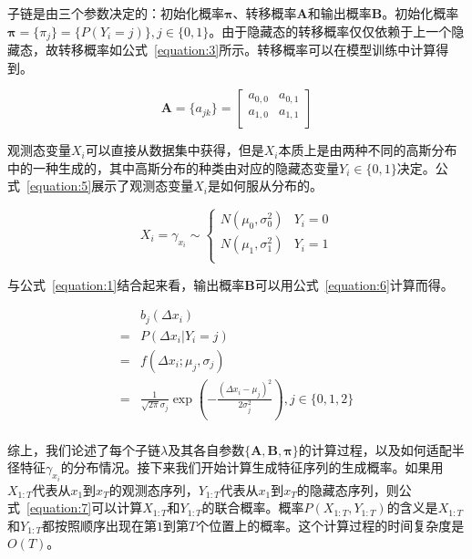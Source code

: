 子链是由三个参数决定的：初始化概率$\mathbf{\pi}$、转移概率$\mathbf{A}$和输出概率$\mathbf{B}$。初始化概率$\mathbf{\pi} = \{\pi_j\} = \{P(Y_i = j)\}, j \in \{0,1\}$。由于隐藏态的转移概率仅仅依赖于上一个隐藏态，故转移概率如公式~\eqref{equation:3}所示。转移概率可以在模型训练中计算得到。

\begin{equation}
\label{equation:3}
\mathbf{A} = \{a_{jk}\} = 
\begin{bmatrix}
a_{0,0}	&	a_{0,1}	\\
a_{1,0}	&	a_{1,1}	\\
\end{bmatrix}
\end{equation}

观测态变量$X_i$可以直接从数据集中获得，但是$X_i$本质上是由两种不同的高斯分布中的一种生成的，其中高斯分布的种类由对应的隐藏态变量$Y_i \in \{0,1\}$决定。公式~\eqref{equation:5}展示了观测态变量$X_i$是如何服从分布的。

\begin{equation}
\label{equation:5}
X_i = \gamma_{x_i} \sim 
\begin{cases}
N(\mu_0, \sigma_0^2)     &     Y_i = 0	\\
N(\mu_1, \sigma_1^2)     &     Y_i = 1	\\
\end{cases} 	
\end{equation}

与公式~\eqref{equation:1}结合起来看，输出概率$\mathbf{B}$可以用公式~\eqref{equation:6}计算而得。


\begin{equation}
\label{equation:6}
\begin{aligned}	
&b_j(\Delta{x_i})\\
= &P(\Delta{x_i} | Y_i = j)\\
= &f(\Delta{x_i};\mu_j, \sigma_j) \\
= &\frac{1}{\sqrt{2\pi}\sigma_j}\exp{(-\frac{(\Delta{x_i}-\mu_j)^2}{2\sigma_j^2})}, j \in \{0,1,2\}\\
\end{aligned}
\end{equation}

综上，我们论述了每个子链$\lambda$及其各自参数$\{\mathbf{A}, \mathbf{B}, \mathbf{\pi}\}$的计算过程，以及如何适配半径特征$\gamma_{x_i}$的分布情况。接下来我们开始计算生成特征序列的生成概率。如果用$X_{1:T}$代表从$x_1$到$x_T$的观测态序列，$Y_{1:T}$代表从$x_1$到$x_T$的隐藏态序列，则公式~\eqref{equation:7}可以计算$X_{1:T}$和$Y_{1:T}$的联合概率。概率$P(X_{1:T}, Y_{1:T})$的含义是$X_{1:T}$和$Y_{1:T}$都按照顺序出现在第$1$到第$T$个位置上的概率。这个计算过程的时间复杂度是$O(T)$。


